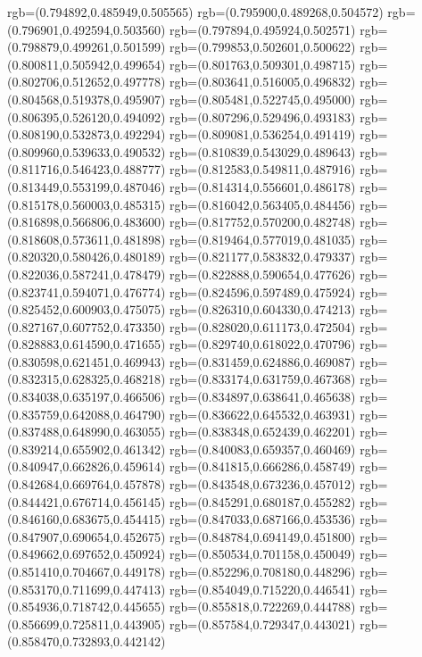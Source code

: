 {{{			rgb=(0.794892,0.485949,0.505565)
			rgb=(0.795900,0.489268,0.504572)
			rgb=(0.796901,0.492594,0.503560)
			rgb=(0.797894,0.495924,0.502571)
			rgb=(0.798879,0.499261,0.501599)
			rgb=(0.799853,0.502601,0.500622)
			rgb=(0.800811,0.505942,0.499654)
			rgb=(0.801763,0.509301,0.498715)
			rgb=(0.802706,0.512652,0.497778)
			rgb=(0.803641,0.516005,0.496832)
			rgb=(0.804568,0.519378,0.495907)
			rgb=(0.805481,0.522745,0.495000)
			rgb=(0.806395,0.526120,0.494092)
			rgb=(0.807296,0.529496,0.493183)
			rgb=(0.808190,0.532873,0.492294)
			rgb=(0.809081,0.536254,0.491419)
			rgb=(0.809960,0.539633,0.490532)
			rgb=(0.810839,0.543029,0.489643)
			rgb=(0.811716,0.546423,0.488777)
			rgb=(0.812583,0.549811,0.487916)
			rgb=(0.813449,0.553199,0.487046)
			rgb=(0.814314,0.556601,0.486178)
			rgb=(0.815178,0.560003,0.485315)
			rgb=(0.816042,0.563405,0.484456)
			rgb=(0.816898,0.566806,0.483600)
			rgb=(0.817752,0.570200,0.482748)
			rgb=(0.818608,0.573611,0.481898)
			rgb=(0.819464,0.577019,0.481035)
			rgb=(0.820320,0.580426,0.480189)
			rgb=(0.821177,0.583832,0.479337)
			rgb=(0.822036,0.587241,0.478479)
			rgb=(0.822888,0.590654,0.477626)
			rgb=(0.823741,0.594071,0.476774)
			rgb=(0.824596,0.597489,0.475924)
			rgb=(0.825452,0.600903,0.475075)
			rgb=(0.826310,0.604330,0.474213)
			rgb=(0.827167,0.607752,0.473350)
			rgb=(0.828020,0.611173,0.472504)
			rgb=(0.828883,0.614590,0.471655)
			rgb=(0.829740,0.618022,0.470796)
			rgb=(0.830598,0.621451,0.469943)
			rgb=(0.831459,0.624886,0.469087)
			rgb=(0.832315,0.628325,0.468218)
			rgb=(0.833174,0.631759,0.467368)
			rgb=(0.834038,0.635197,0.466506)
			rgb=(0.834897,0.638641,0.465638)
			rgb=(0.835759,0.642088,0.464790)
			rgb=(0.836622,0.645532,0.463931)
			rgb=(0.837488,0.648990,0.463055)
			rgb=(0.838348,0.652439,0.462201)
			rgb=(0.839214,0.655902,0.461342)
			rgb=(0.840083,0.659357,0.460469)
			rgb=(0.840947,0.662826,0.459614)
			rgb=(0.841815,0.666286,0.458749)
			rgb=(0.842684,0.669764,0.457878)
			rgb=(0.843548,0.673236,0.457012)
			rgb=(0.844421,0.676714,0.456145)
			rgb=(0.845291,0.680187,0.455282)
			rgb=(0.846160,0.683675,0.454415)
			rgb=(0.847033,0.687166,0.453536)
			rgb=(0.847907,0.690654,0.452675)
			rgb=(0.848784,0.694149,0.451800)
			rgb=(0.849662,0.697652,0.450924)
			rgb=(0.850534,0.701158,0.450049)
			rgb=(0.851410,0.704667,0.449178)
			rgb=(0.852296,0.708180,0.448296)
			rgb=(0.853170,0.711699,0.447413)
			rgb=(0.854049,0.715220,0.446541)
			rgb=(0.854936,0.718742,0.445655)
			rgb=(0.855818,0.722269,0.444788)
			rgb=(0.856699,0.725811,0.443905)
			rgb=(0.857584,0.729347,0.443021)
			rgb=(0.858470,0.732893,0.442142)
}}}
